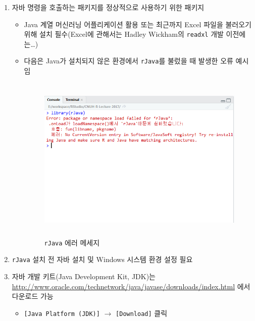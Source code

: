 \documentclass[12pt,a4paper]{book}
\providecommand{\tightlist}{%
  \setlength{\itemsep}{0pt}\setlength{\parskip}{0pt}}
\theoremstyle{definition}
\theoremstyle{definition}
\theoremstyle{definition}
\theoremstyle{remark}
\begin{document}
\begin{enumerate}
\def\labelenumi{\arabic{enumi}.}
\item
  자바 명령을 호출하는 패키지를 정상적으로 사용하기 위한 패키지

  \begin{itemize}
  \tightlist
  \item
    Java 계열 머신러닝 어플리케이션 활용 또는 최근까지 Excel 파일을
    불러오기 위해 설치 필수(Excel에 관해서는 Hadley Wickham의
    \texttt{readxl} 개발 이전에는\ldots{})
  \item
    다음은 Java가 설치되지 않은 환경에서 \texttt{rJava}를 불렀을 때
    발생한 오류 예시임

    \begin{figure}[H] {
      \centering
      \includegraphics[width = 10cm, height = 8cm]{Figures/R-rJava-error.png}
      \caption[\texttt{rJava} 에러 메세지]{\texttt{rJava} 에러 메세지}\label{fig:rJava-error}
    } \end{figure}
  \end{itemize}
\item
  \texttt{rJava} 설치 전 자바 설치 및 Windows 시스템 환경 설정 필요
\item
  자바 개발 키트(Java Development Kit, JDK)는
  \url{http://www.oracle.com/technetwork/java/javase/downloads/index.html}
  에서 다운로드 가능

  \begin{itemize}
  \tightlist
  \item
    \texttt{{[}Java\ Platform\ (JDK){]}} \(\rightarrow\)
    \texttt{{[}Download{]}} 클릭


\end{itemize}
\end{enumerate}
\end{document}
